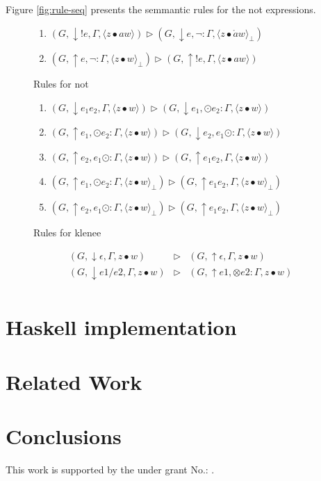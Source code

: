 \documentclass[manuscript, review, sigconf]{acmart}
\newcommand{\zpp}[2]{\langle #1\bullet #2 \rangle}
\newcommand{\zppf}[2]{\langle #1\bullet #2 \rangle_{\bot}}
\begin{document}
Figure \ref{fig:rule-seq} presents the semmantic rules for the not expressions. 


\begin{figure}[H]
\begin{enumerate}\addtocounter{enumi}{9}
  \item \label{r140} $(G, \downarrow ! e,\Gamma ,\zpp{z}{aw})       \rhd  (G, \downarrow e, \neg : \Gamma, \zppf{z}{\mathring{a}w})$ 
  \item \label{r150} $(G, \uparrow e , \neg : \Gamma ,\zppf{z}{w}) \rhd  (G, \uparrow !e,  \Gamma, \zpp{z}{aw})$ 
\end{enumerate}
 \caption{Rules for not}
 \label{fig:rule-not}
\end{figure}



\begin{figure}[H]
\begin{enumerate}\addtocounter{enumi}{9}
  \item \label{r390} $(G, \downarrow e_1e_2,\Gamma ,\zpp{z}{w})    \rhd  (G, \downarrow e_1,  \odot e_2 : \Gamma, \zpp{z}{w})$ 
  \item \label{r300} $(G, \uparrow e_1 ,\odot e_2 : \Gamma ,\zpp{z}{w})   \rhd  (G, \downarrow e_2, e_1 \odot : \Gamma, \zpp{z}{w})$ 
  \item \label{r310} $(G, \uparrow e_2 ,e_1 \odot  : \Gamma ,\zpp{z}{w})   \rhd  (G, \uparrow e_1e_2, \Gamma, \zpp{z}{w})$
  \item \label{r320} $(G, \uparrow e_1 ,  \odot e_2 : \Gamma ,\zppf{z}{w})   \rhd  (G, \uparrow e_1 e_2, \Gamma, \zppf{z}{w})$ 
  \item \label{r330} $(G, \uparrow e_2 ,e_1 \odot  : \Gamma ,\zppf{z}{w})   \rhd  (G, \uparrow e_1e_2, \Gamma, \zppf{z}{w})$
\end{enumerate}
 \caption{Rules for klenee}
 \label{fig:rule-kle}
\end{figure}


\[
\begin{array}{lcl} 
 (G, \downarrow \epsilon,\Gamma ,z \bullet w) & \rhd & (G, \uparrow \epsilon, \Gamma, z \bullet w) \\
 (G, \downarrow e1/e2, \Gamma ,z \bullet w)   & \rhd & (G, \uparrow e1, \otimes e2 : \Gamma, z \bullet w) \\
\end{array}
\]

\section{Haskell implementation}

\section{Related Work} \label{sec:related}


\section{Conclusions} \label{sec:conc}


\begin{acks}
This work is supported by the  under grant No.: .
\end{acks}




\end{document}
